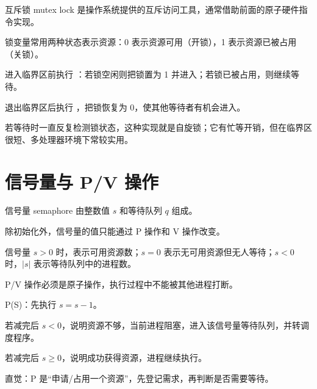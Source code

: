 \begin{points}
  \item 互斥锁 mutex lock 是操作系统提供的互斥访问工具，通常借助前面的原子硬件指令实现。
  \item 锁变量常用两种状态表示资源：0 表示资源可用（开锁），1 表示资源已被占用（关锁）。
  \item 进入临界区前执行 ：若锁空闲则把锁置为 1 并进入；若锁已被占用，则继续等待。
  \item 退出临界区后执行 ，把锁恢复为 0，使其他等待者有机会进入。
  \item 若等待时一直反复检测锁状态，这种实现就是自旋锁；它有忙等开销，但在临界区很短、多处理器环境下常较实用。
\end{points}


\section{信号量与 P/V 操作}
\begin{points}
  \item 信号量 semaphore 由整数值 $s$ 和等待队列 $q$ 组成。
  \item 除初始化外，信号量的值只能通过 P 操作和 V 操作改变。
  \item 信号量 $s>0$ 时，表示可用资源数；$s=0$ 表示无可用资源但无人等待；$s<0$ 时，$|s|$ 表示等待队列中的进程数。
  \item P/V 操作必须是原子操作，执行过程中不能被其他进程打断。
\end{points}


\begin{points}
  \item P(S)：先执行 $s=s-1$。
  \item 若减完后 $s<0$，说明资源不够，当前进程阻塞，进入该信号量等待队列，并转调度程序。
  \item 若减完后 $s\ge 0$，说明成功获得资源，进程继续执行。
  \item 直觉：P 是“申请/占用一个资源”，先登记需求，再判断是否需要等待。
\end{points}


